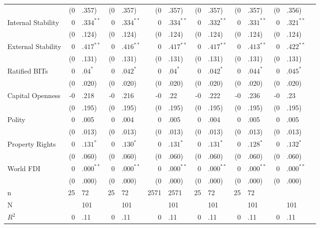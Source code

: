 \documentclass[12pt,onesided]{amsart}
\begin{document}
\begin{table}[ht]
{\begin{tabular}{lr@{} lr@{}lr@{}lr@{} lr@{}lr@{}lr@{} }
   & (0&.357) & (0&.357) & (0&.357) & (0&.357) & (0&.357) & (0&.356) \\ 
  Internal Stability & $0$&$.334^{\ast\ast}$ & $0$&$.334^{\ast\ast}$ & $0$&$.334^{\ast\ast}$ & $0$&$.332^{\ast\ast}$ & $0$&$.331^{\ast\ast}$ & $0$&$.321^{\ast\ast}$ \\ 
   & (0&.124) & (0&.124) & (0&.124) & (0&.124) & (0&.124) & (0&.124) \\ 
  External Stability & $0$&$.417^{\ast\ast}$ & $0$&$.416^{\ast\ast}$ & $0$&$.417^{\ast\ast}$ & $0$&$.417^{\ast\ast}$ & $0$&$.413^{\ast\ast}$ & $0$&$.422^{\ast\ast}$ \\ 
   & (0&.131) & (0&.131) & (0&.131) & (0&.131) & (0&.131) & (0&.131) \\ 
  Ratified BITs & $0$&$.04^{\ast}$ & $0$&$.042^{\ast}$ & $0$&$.04^{\ast}$ & $0$&$.042^{\ast}$ & $0$&$.044^{\ast}$ & $0$&$.045^{\ast}$ \\ 
   & (0&.020) & (0&.020) & (0&.020) & (0&.020) & (0&.020) & (0&.020) \\ 
  Capital Openness & -0&.218 & -0&.216 & -0&.22 & -0&.222 & -0&.236 & -0&.23 \\ 
   & (0&.195) & (0&.195) & (0&.195) & (0&.195) & (0&.195) & (0&.195) \\ 
  Polity & 0&.005 & 0&.004 & 0&.005 & 0&.004 & 0&.005 & 0&.005 \\ 
   & (0&.013) & (0&.013) & (0&.013) & (0&.013) & (0&.013) & (0&.013) \\ 
  Property Rights & $0$&$.131^{\ast}$ & $0$&$.130^{\ast}$ & $0$&$.131^{\ast}$ & $0$&$.131^{\ast}$ & $0$&$.128^{\ast}$ & $0$&$.132^{\ast}$ \\ 
   & (0&.060) & (0&.060) & (0&.060) & (0&.060) & (0&.060) & (0&.060) \\ 
  World FDI & $0$&$.000^{\ast\ast}$ & $0$&$.000^{\ast\ast}$ & $0$&$.000^{\ast\ast}$ & $0$&$.000^{\ast\ast}$ & $0$&$.000^{\ast\ast}$ & $0$&$.000^{\ast\ast}$ \\ 
   & (0&.000) & (0&.000) & (0&.000) & (0&.000) & (0&.000) & (0&.000) \\ 
   \hline
n & 25&72 & 25&72 & 2571 & 2571 & 25&72 & 25&72 \\ 
  N && 101 && 101 && 101 && 101 && 101 && 101 \\ 
  $R^{2}$ & 0&.11 & 0&.11 & 0&.11 & 0&.11 & 0&.11 & 0&.11 \\ 
   \hline
\hline
\end{tabular}
}
\end{table}
\end{document}

